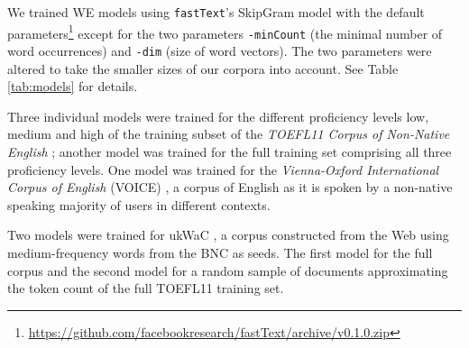 \documentclass[11pt,a4paper]{article}
\newcommand\fT{\texttt{fastText}\xspace}
\begin{document}
We trained WE models using \fT's SkipGram model with the default parameters\footnote{\url{https://github.com/facebookresearch/fastText/archive/v0.1.0.zip}} except for the two parameters \texttt{-minCount} (the minimal number of word occurrences) and \texttt{-dim} (size of word vectors). 
The two parameters were altered to take the smaller sizes of our corpora into account. See Table \ref{tab:models} for details.

Three individual models were trained for the different proficiency levels low, medium and high of the training subset of the \emph{TOEFL11 Corpus of Non-Native English} \cite{ETS2:ETS202331}; another model was trained for the full training set comprising all three proficiency levels. One model was trained for the \emph{Vienna-Oxford International Corpus of English} (VOICE) \cite{Seidlhofer2013}, a corpus of English as it is spoken by a non-native speaking majority of users in different contexts.

Two models were trained for ukWaC \cite{wackycorpora2009}, a corpus constructed from the Web using medium-frequency words from the BNC as seeds.
The first model for the full corpus and the second model for a random sample of documents approximating the token count of the full TOEFL11 training set.
\end{document}
